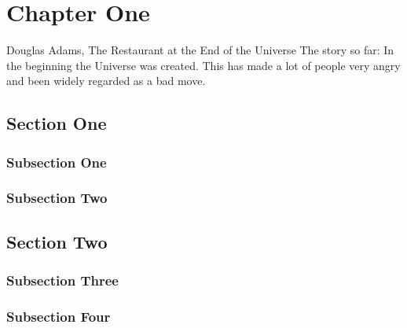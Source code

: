 \chapter{Chapter One}

\begin{chapterquote}{Douglas Adams, The Restaurant at the End of the Universe}
    The story so far:
    In the beginning the Universe was created.
    This has made a lot of people very angry and been widely regarded as a bad move.
\end{chapterquote}

\lipsum[1-4]
\section{Section One}
\lipsum[5-8]
\subsection{Subsection One}
\lipsum[9-12]
\subsection{Subsection Two}
\lipsum[13-16]
\section{Section Two}
\lipsum[17-20]
\subsection{Subsection Three}
\lipsum[21-24]
\subsection{Subsection Four}
\lipsum[25-28]
